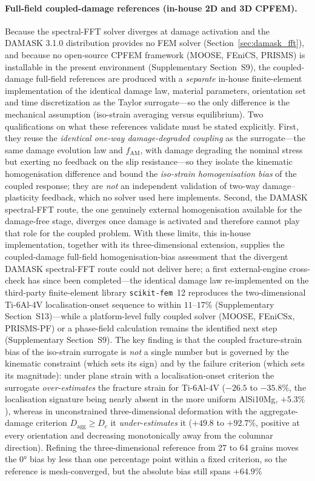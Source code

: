 \documentclass[twocolumn]{sagej}
\begin{document}
\paragraph{Full-field coupled-damage references (in-house 2D and 3D CPFEM).}
Because the spectral-FFT solver diverges at damage activation and the DAMASK 3.1.0 distribution provides no FEM solver (Section~\ref{sec:damask_fft}), and because no open-source CPFEM framework (MOOSE, FEniCS, PRISMS) is installable in the present environment (Supplementary Section~S9), the coupled-damage full-field references are produced with a \emph{separate} in-house finite-element implementation of the identical damage law, material parameters, orientation set and time discretization as the Taylor surrogate---so the only difference is the mechanical assumption (iso-strain averaging versus equilibrium). Two qualifications on what these references validate must be stated explicitly. First, they reuse the \emph{identical one-way damage-degraded coupling} as the surrogate---the same damage evolution law and $f_{\mathrm{AM}}$, with damage degrading the nominal stress but exerting no feedback on the slip resistance---so they isolate the kinematic homogenisation difference and bound the \emph{iso-strain homogenisation bias} of the coupled response; they are \emph{not} an independent validation of two-way damage--plasticity feedback, which no solver used here implements. Second, the DAMASK spectral-FFT route, the one genuinely external homogenisation available for the damage-free stage, diverges once damage is activated and therefore cannot play that role for the coupled problem. With these limits, this in-house implementation, together with its three-dimensional extension, supplies the coupled-damage full-field homogenisation-bias assessment that the divergent DAMASK spectral-FFT route could not deliver here; a first external-engine cross-check has since been completed---the identical damage law re-implemented on the third-party finite-element library \texttt{scikit-fem}~12 reproduces the two-dimensional Ti-6Al-4V localisation-onset sequence to within $11$--$17\%$ (Supplementary Section~S13)---while a platform-level fully coupled solver (MOOSE, FEniCSx, PRISMS-PF) or a phase-field calculation remains the identified next step (Supplementary Section~S9). The key finding is that the coupled fracture-strain bias of the iso-strain surrogate is \emph{not} a single number but is governed by the kinematic constraint (which sets its sign) and by the failure criterion (which sets its magnitude): under plane strain with a localisation-onset criterion the surrogate \emph{over-estimates} the fracture strain for Ti-6Al-4V ($-26.5$ to $-35.8\%$, the localisation signature being nearly absent in the more uniform AlSi10Mg, $+5.3\%$), whereas in unconstrained three-dimensional deformation with the aggregate-damage criterion $D_{\mathrm{agg}}\ge D_c$ it \emph{under-estimates} it ($+49.8$ to $+92.7\%$, positive at every orientation and decreasing monotonically away from the columnar direction). Refining the three-dimensional reference from 27 to 64 grains moves the $\ang{0}$ bias by less than one percentage point within a fixed criterion, so the reference is mesh-converged, but the absolute bias still spans $+64.9\%$ 
\end{document}
